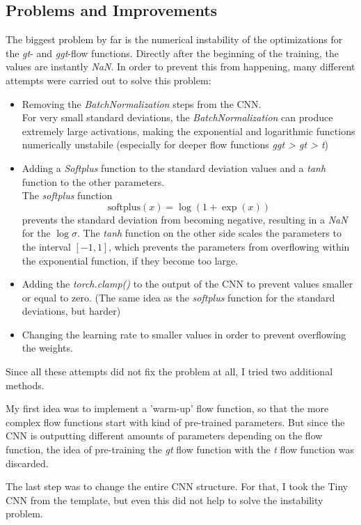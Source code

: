 \subsection{Problems and Improvements}
The biggest problem by far is the numerical instability of the optimizations for the \textit{gt}- and \textit{ggt}-flow functions.
Directly after the beginning of the training, the values are instantly \textit{NaN}.
In order to prevent this from happening, many different attempts were carried out to solve this problem:
\begin{itemize}
  \item Removing the \textit{BatchNormalization} steps from the CNN.\\
  For very small standard deviations, the \textit{BatchNormalization} can produce extremely large activations, making the exponential and logarithmic functions numerically unstabile (especially for deeper flow functions \textit{ggt > gt > t})
  \item Adding a \textit{Softplus} function to the standard deviation values and a \textit{tanh} function to the other parameters.\\
  The \textit{softplus} function
  \begin{equation}
    \nonumber
    \text{softplus}(x) = \log(1 + \exp(x))
  \end{equation}
  prevents the standard deviation from becoming negative, resulting in a \textit{NaN} for the $\log{\sigma}$.
  The \textit{tanh} function on the other side scales the parameters to the interval $[-1, 1]$, which prevents the parameters from overflowing within the exponential function, if they become too large.
  \item Adding the \textit{torch.clamp()} to the output of the CNN to prevent values smaller or equal to zero. (The same idea as the \textit{softplus} function for the standard deviations, but harder)
  \item Changing the learning rate to smaller values in order to prevent overflowing the weights.
\end{itemize}
Since all these attempts did not fix the problem at all, I tried two additional methods.

My first idea was to implement a 'warm-up' flow function, so that the more complex flow functions start with kind of pre-trained parameters.
But since the CNN is outputting different amounts of parameters depending on the flow function, the idea of pre-training the \textit{gt} flow function with the \textit{t} flow function was discarded.

The last step was to change the entire CNN structure. For that, I took the Tiny CNN from the template, but even this did not help to solve the instability problem.

